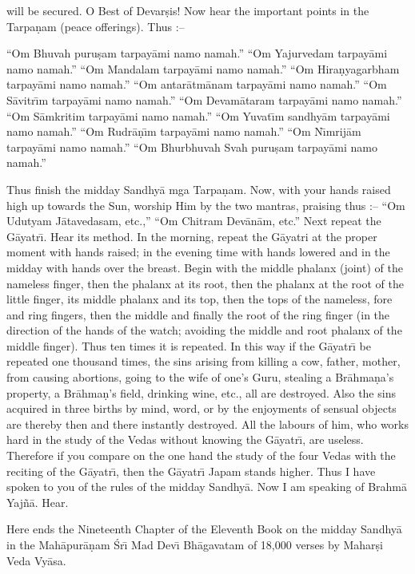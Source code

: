 will be secured. O Best of Devar\d{s}is! Now hear the important points in the Tarpa\d{n}am (peace offerings). Thus :--

``Om Bhuvah puru\d{s}am tarpay\=ami namo namah.''
``Om Yajurvedam tarpay\=ami namo namah.''
``Om Mandalam tarpay\=ami namo namah.''
``Om Hira\d{n}yagarbham tarpay\=ami namo namah.''
``Om antar\=atm\=anam tarpay\=ami namo namah.''
``Om S\=avitr\={\i}m tarpay\=ami namo namah.''
``Om Devam\=ataram tarpay\=ami namo namah.''
``Om S\=amkritim tarpay\=ami namo namah.''
``Om Yuvat\={\i}m sandhy\=am tarpay\=ami namo namah.''
``Om Rudr\=a\d{n}\={\i}m tarpay\=ami namo namah.''
``Om N\={\i}mrij\=am tarpay\=ami namo namah.''
``Om Bhurbhuvah Svah puru\d{s}am tarpay\=ami namo namah.''

Thus finish the midday Sandhy\=a mga Tarpa\d{n}am. Now, with your hands raised high up towards the Sun, worship Him by the two mantras, praising thus :-- ``Om Udutyam J\=atavedasam, etc.,'' ``Om Chitram Dev\=an\=am, etc.'' Next repeat the G\=ayatr\={\i}. Hear its method. In the morning, repeat the G\=ayatri at the proper moment with hands raised; in the evening time with hands lowered and in the midday with hands over the breast. Begin with the middle phalanx (joint) of the nameless finger, then the phalanx at its root, then the phalanx at the root of the little finger, its middle phalanx and its top, then the tops of the nameless, fore and ring fingers, then the middle and finally the root of the ring finger (in the direction of the hands of the watch; avoiding the middle and root phalanx of the middle finger). Thus ten times it is repeated. In this way if the G\=ayatr\={\i} be repeated one thousand times, the sins arising from killing a cow, father, mother, from causing abortions, going to the wife of one's Guru, stealing a Br\=ahma\d{n}a's property, a Br\=ahma\d{n}'s field, drinking wine, etc., all are destroyed. Also the sins acquired in three births by mind, word, or by the enjoyments of sensual objects are thereby then and there instantly destroyed. All the labours of him, who works hard in the study of the Vedas without knowing the G\=ayatr\={\i}, are useless. Therefore if you compare on the one hand the study of the four Vedas with the reciting of the G\=ayatr\={\i}, then the G\=ayatr\={\i} Japam stands higher. Thus I have spoken to you of the rules of the midday Sandhy\=a. Now I am speaking of Brahm\=a Yaj\~n\=a. Hear.

Here ends the Nineteenth Chapter of the Eleventh Book on the midday Sandhy\=a in the Mah\=apur\=a\d{n}am \'Sr\={\i} Mad Dev\={\i} Bh\=agavatam of 18,000 verses by Mahar\d{s}i Veda Vy\=asa.



